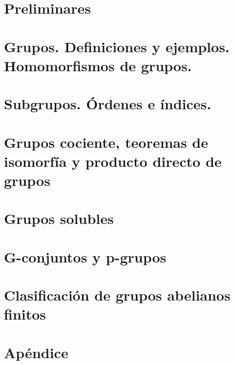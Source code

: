 \section{Preliminares}

\newpage
\section{Grupos. Definiciones y ejemplos. Homomorfismos de grupos.}

\newpage

\section{Subgrupos. Órdenes e índices.}

\newpage
\section{Grupos cociente, teoremas de isomorfía y producto directo de grupos}

\newpage

\section{Grupos solubles}

\newpage

\section{G-conjuntos y p-grupos}

\newpage

\section{Clasificación de grupos abelianos finitos}

\newpage

\section{Apéndice}

\newpage
